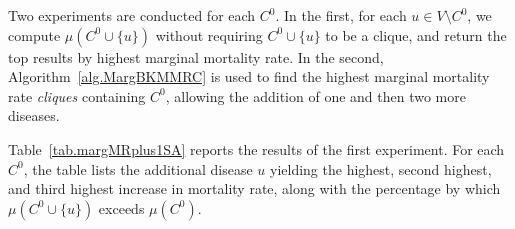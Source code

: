 Two experiments are conducted for each $C^0$. In the first,
for each $u \in V \setminus C^0$, we compute $\mu(C^0 \cup
\{u\})$ without requiring $C^0 \cup \{u\}$ to be a clique,
and return the top results by highest marginal mortality rate.
In the second, Algorithm~\ref{alg.MargBKMMRC} is used to find
the highest marginal mortality rate \textit{cliques} containing
$C^0$, allowing the addition of one and then two more diseases.

\begin{table}[htbp]
\centering
{}
\caption{Top-3 Most Lethal Subsets Formed by the Addition of a Single
Disease}
\label{tab.margMRplus1SA}
\end{table}

Table~\ref{tab.margMRplus1SA} reports the results of the first experiment. For each $C^0$, the table lists the additional disease
$u$ yielding the highest, second highest, and third highest increase
in mortality rate, along with the percentage by which
$\mu(C^0 \cup \{u\})$ exceeds $\mu(C^0)$.

